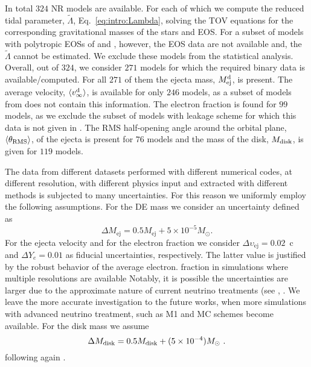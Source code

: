 In total $324$ \ac{NR} models are available.
For each of which we compute the reduced tidal parameter, $\tilde{\Lambda}$, 
Eq.~\eqref{eq:intro:Lambda}, solving the \ac{TOV} equations for the corresponding 
gravitational masses of the stars and \ac{EOS}.
% 
For a subset of models with polytropic \acp{EOS} of \citet{Bauswein:2013jpa}
and \citet{Kiuchi:2019lls}, however, the \ac{EOS} data are not available and, 
the $\tilde{\Lambda}$ cannot be estimated. We exclude these models from the 
statistical analysis. Overall, out of $324$, we consider $271$ models for which 
the required binary data is available/computed. For all $271$ of them the ejecta 
mass, $M^{\text{d}}_{\text{ej}}$, is present. The average velocity, $\langle v^{\text{d}}_\infty\rangle$, is available for only $246$ 
models, as a subset of models from \citet{Kiuchi:2019lls} does not contain this 
information. The electron fraction is found for $99$ models, as we exclude the 
subset of models with leakage scheme for which this data is not given in 
\citet{Lehner:2016lxy}. The \ac{RMS} half-opening angle around the orbital plane, 
$\langle\theta_{\rm RMS}\rangle$, of the ejecta is present for $76$ models and the mass of the disk, 
$M_{\rm disk}$, is given for $119$ models.

The data from different datasets performed with different numerical codes, at 
different resolution, with different physics input and extracted with different 
methods is subjected to many uncertainties. 
For this reason we uniformly employ the following assumptions.
%
For the \ac{DE} mass we consider an uncertainty defined as  \citep{Radice:2018pdn}
%
\begin{equation}
\Delta M_{\text{ej}} = 0.5M_{\text{ej}} + 5\times10^{-5}M_{\odot}.
\label{eq:ejecta:mej_err}
\end{equation}
%
For the ejecta velocity and for the electron fraction we consider 
$\Delta \upsilon_{\text{ej}} = 0.02$~c 
and $ \Delta Y_e = 0.01$ as fiducial uncertainties, respectively.
The latter value is justified by the robust behavior of the average electron. 
fraction in simulations where multiple resolutions are available
Notably, it is possible the uncertainties are larger due to the approximate nature of current 
neutrino treatments (see \eg, \citet{Foucart:2016rxm,Foucart:2018gis}. 
We leave the more accurate investigation to the future works, when more simulations
with advanced neutrino treatment, such as M1 and \ac{MC} schemes become available. 
%
For the disk mass we assume 
\begin{equation}
\Delta M_{\text{disk}} = 0.5M_{\rm disk} + (5\times
10^{-4})M_{\odot}\ .
\label{eq:disk:mdisk_err}
\end{equation}
following again \citet{Radice:2018pdn}.

